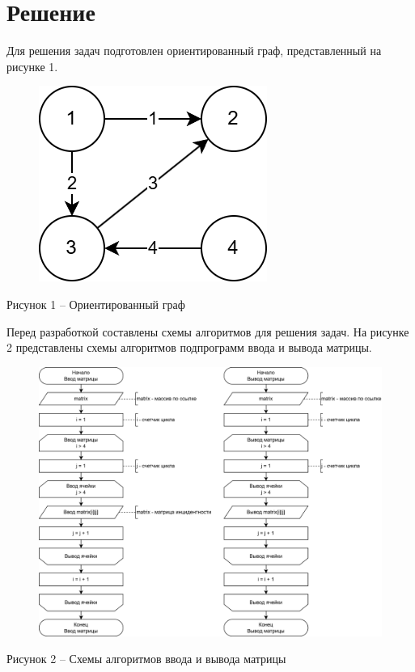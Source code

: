 \documentclass[a4paper,14pt]{extarticle}
\begin{document}
  \section*{\hspace{12.5mm}Решение}

  Для решения задач подготовлен ориентированный граф, представленный на рисунке 1.

  \begin{figure}[h]
    \centering
    \includegraphics[width=0.4\linewidth]{images/graph.png}
  \end{figure}
  \begin{center}
    Рисунок 1 – Ориентированный граф
  \end{center}

  \pagebreak
  Перед разработкой составлены схемы алгоритмов для решения задач. На рисунке 2 представлены схемы алгоритмов подпрограмм ввода и вывода матрицы.

  \begin{figure}[h]
    \centering
    \includegraphics[width=1\linewidth]{images/s-1.png}
  \end{figure}
  \begin{center}
    Рисунок 2 – Схемы алгоритмов ввода и вывода матрицы
  \end{center}
\end{document}

